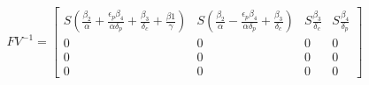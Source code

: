 \documentclass[preview]{standalone}
\begin{document}
\begin{align*}
FV^{-1} = \begin{bmatrix} S ( \frac{\beta_2}{\alpha} + \frac{\epsilon_p \beta_4}{\alpha \delta_p} + \frac{\beta_3}{\delta_c} + \frac{\beta1}{\gamma} ) & S (\frac{\beta_2}{\alpha} - \frac{\epsilon_p \beta_4}{\alpha \delta_p} + \frac{\beta_3}{\delta_c}) & S \frac{\beta_3}{\delta_c} & S \frac{\beta_4}{\delta_p} \\ 0 & 0 & 0 & 0 \\ 0 & 0 & 0 & 0 \\ 0 & 0 & 0 & 0 \end{bmatrix}
\end{align*}
\end{document}
